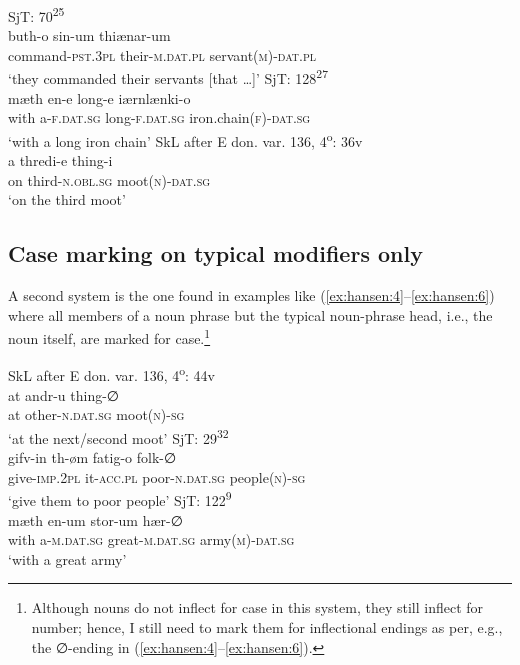 \documentclass[output=paper]{langsci/langscibook}
\begin{document}
\ea \label{ex:hansen:1}
{SjT: 70\textsuperscript{25}} \\ 
\gll buth-o sin-um thiænar-um\\
     command-\textsc{pst.3pl} their-\textsc{m.dat.pl} servant\textsc{(m)-dat.pl}{\footnotemark}\\
\glt ‘they commanded their servants [that …]’
\ex \label{ex:hansen:2}
{SjT: 128\textsuperscript{27}}  \\ 
\gll mæth en-e long-e iærnlænki-o\\
     with a\textsc{{}-}\textsc{f.dat.sg} long\textsc{{}-}\textsc{f.dat.sg} iron.chain\textsc{(f)-dat.sg}\\
\glt ‘with a long iron chain’
\ex \label{ex:hansen:3}
{SkL after E don. var. 136, 4\textsuperscript{o}: 36v} \\ 
\gll a thredi-e thing-i\\
     on third\textsc{{}-}\textsc{n.obl.sg} moot\textsc{(n)-dat.sg}\\
\glt ‘on the third moot’
\z

\subsection{Case marking on typical modifiers only} \label{hansen:2.3}

A second system is the one found in examples like (\ref{ex:hansen:4}--\ref{ex:hansen:6}) where all members of a noun phrase but the typical noun-phrase head, i.e., the noun itself, are marked for case.\footnote{Although nouns do not inflect for case in this system, they still inflect for number; hence, I still need to mark them for inflectional endings as per, e.g., the ∅-ending in (\ref{ex:hansen:4}--\ref{ex:hansen:6}).}

\ea \label{ex:hansen:4}
{SkL after E don. var. 136, 4\textsuperscript{o}: 44v} \\ 
\gll at andr-u thing-∅\\
     at other\textsc{{}-}\textsc{n.dat.sg} moot\textsc{(n)-sg}\\
\glt ‘at the next/second moot’
\ex \label{ex:hansen:5}
{SjT: 29\textsuperscript{32}}\\ 
\gll gifv-in th-øm fatig-o folk-∅\\
     give\textsc{{}-}\textsc{imp.2pl} it\textsc{{}-}\textsc{acc.pl} poor\textsc{{}-}\textsc{n.dat.sg} people\textsc{(n)-sg}\\
\glt ‘give them to poor people’
\ex \label{ex:hansen:6} 
{SjT: 122\textsuperscript{9}}\\ 
\gll mæth en-um stor-um hær-∅\\
     with a\textsc{{}-}\textsc{m.dat.sg} great\textsc{{}-}\textsc{m.dat.sg} army\textsc{(m)-dat.sg}\\
\glt ‘with a great army’
\z
\end{document}
